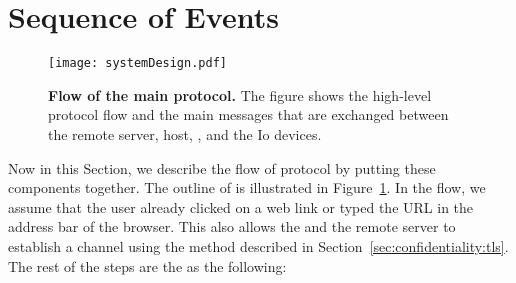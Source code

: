 \section*{\name Sequence of Events}
\label{appendix:protocol}


\begin{figure}[t]
\centering
\texttt{[image: systemDesign.pdf]}
\caption{\textbf{Flow of the \name main protocol.} The figure shows the high-level protocol flow and the main messages that are exchanged between the remote server, host, \device, and the Io devices.}
\spacesave
\label{fig:systemDesign}
\centering
\end{figure}


Now in this Section, we describe the flow of \name protocol by putting these components together. The outline of \name is illustrated in Figure~\ref{fig:systemDesign}. In the flow, we assume that the user already clicked on a web link or typed the URL in the address bar of the browser. This also allows the \device and the remote server to establish a \tls channel using the method described in Section~\ref{sec:confidentiality:tls}. The rest of the steps are the as the following:


